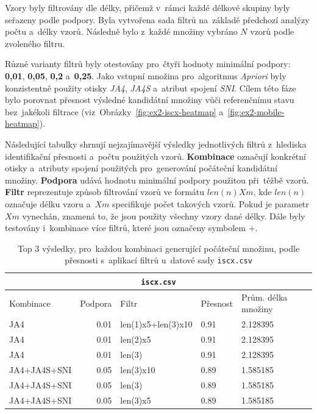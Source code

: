 Vzory byly filtrovány dle délky, přičemž v~rámci každé délkové skupiny byly seřazeny podle podpory. Byla vytvořena sada filtrů na~základě předchozí analýzy počtu a~délky vzorů. Následně bylo z~každé množiny vybráno $N$ vzorů podle zvoleného filtru.

Různé varianty filtrů byly otestovány pro~čtyři hodnoty minimální podpory: \textbf{0{,}01}, \textbf{0{,}05}, \textbf{0{,}2} a~\textbf{0{,}25}. Jako vstupní množina pro~algoritmus \textit{Apriori} byly konzistentně použity otisky \textit{JA4}, \textit{JA4S} a~atribut spojení \textit{SNI}. Cílem této fáze bylo porovnat přesnost výsledné kandidátní množiny vůči referenčnímu stavu bez~jakékoli filtrace (viz~Obrázky~\ref{fig:ex2-iscx-heatmap} a~\ref{fig:ex2-mobile-heatmap}).

Následující tabulky shrnují nejzajímavější výsledky jednotlivých filtrů z~hlediska identifikační přesnosti a~počtu použitých vzorů. \textbf{Kombinace} označují konkrétní otisky a~atributy spojení použitých pro~generování počáteční kandidátní množiny. \textbf{Podpora} udává hodnotu minimální podpory použitou při~těžbě vzorů. \textbf{Filtr} reprezentuje způsob filtrování vzorů ve formátu \(len(n)Xm\), kde \(len(n)\) označuje délku vzoru a~\(Xm\) specifikuje počet takových vzorů. Pokud je parametr \(Xm\) vynechán, znamená to, že jsou použity všechny vzory dané délky. Dále byly testovány i~kombinace více filtrů, které jsou označeny symbolem \(+\). 

\begin{table}[H]
	\centering
	\begin{tabular}{lrlll}
		\toprule
		\multicolumn{5}{c}{\texttt{iscx.csv}}  \\
		\midrule
		Kombinace    & Podpora & Filtr              & Přesnost & Prům. délka množiny \\
		\midrule
		JA4          & 0.01    & len(1)x5+len(3)x10 & 0.91      & 2.128395                    \\
		JA4          & 0.01    & len(2)x5           & 0.91      & 2.128395                    \\
		JA4          & 0.01    & len(3)             & 0.91      & 2.128395                    \\
		JA4+JA4S+SNI & 0.05    & len(3)x10          & 0.89      & 1.585185                    \\
		JA4+JA4S+SNI & 0.05    & len(3)             & 0.89      & 1.585185                    \\
		JA4+JA4S+SNI & 0.05    & len(3)x5           & 0.89      & 1.585185                    \\
		\bottomrule
	\end{tabular}
	\caption{Top 3 výsledky, pro~každou kombinaci generující počáteční množinu,  podle přesnosti s~aplikací filtrů  u~datové sady \texttt{iscx.csv}}
	\label{tab:top3-iscx}
\end{table}


